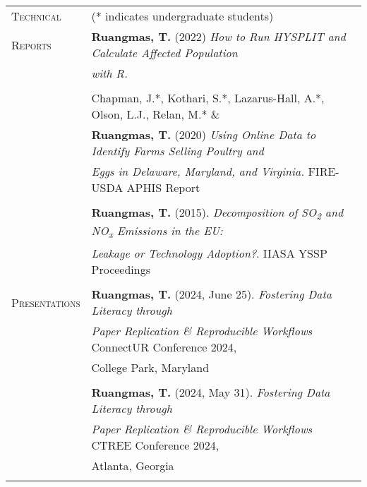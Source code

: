 \documentclass[letterpaper,11pt,oneside]{article}\usepackage[]{graphicx}\usepackage[]{xcolor}
\begin{document}
\begin{tabular}{p{1.2in} l}
\textsc{Technical}  & (* indicates undergraduate students) \\
\textsc{Reports}    & \textbf{Ruangmas, T.} (2022) \textit{How to Run HYSPLIT and Calculate Affected Population} \\
                    & \textit{with R.} \href{https://ruangmas.github.io/hysplit.html}{\color{blue}{[LINK]}} \\
                    & \\
                        & Chapman, J.*, Kothari, S.*, Lazarus-Hall, A.*, Olson, L.J., Relan, M.* \& \\
                        & \textbf{Ruangmas, T.} (2020) \textit{Using Online Data to Identify Farms Selling Poultry and} \\
                        & \textit{Eggs in Delaware, Maryland, and Virginia.} FIRE-USDA APHIS Report\\
                        & \\
                        & \textbf{Ruangmas, T.} (2015). \textit{Decomposition of SO\textsubscript{2} and NO\textsubscript{x} Emissions in the EU:}  \\
                        &  \textit{Leakage or Technology Adoption?}. IIASA YSSP Proceedings \href{https://previous.iiasa.ac.at/web/scientificUpdate/2014/Ruangmas_Thanicha.html}{\color{blue}{[LINK]}} \\
                        & \\
\textsc{Presentations} & \textbf{Ruangmas, T.} (2024, June 25). \textit{Fostering Data Literacy through} \\
                        & \textit{Paper Replication \& Reproducible Workflows} ConnectUR Conference 2024, \\
                        & College Park, Maryland \\
                        & \\
                        & \textbf{Ruangmas, T.} (2024, May 31). \textit{Fostering Data Literacy through}\\
                        & \textit{Paper Replication \& Reproducible Workflows} CTREE Conference 2024, \\
                        & Atlanta, Georgia\\
                        & \\
\end{tabular}                        
\newpage                        
\end{document}

